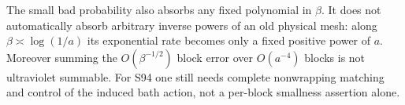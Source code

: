 \documentclass{article}
\begin{document}
The small bad probability also absorbs any fixed polynomial in $\beta$. It does not automatically absorb arbitrary inverse powers of an old physical mesh: along $\beta\asymp\log(1/a)$ its exponential rate becomes only a fixed positive power of $a$. Moreover summing the $O(\beta^{-1/2})$ block error over $O(a^{-4})$ blocks is not ultraviolet summable. For S94 one still needs complete nonwrapping matching and control of the induced bath action, not a per-block smallness assertion alone.
\end{document}
